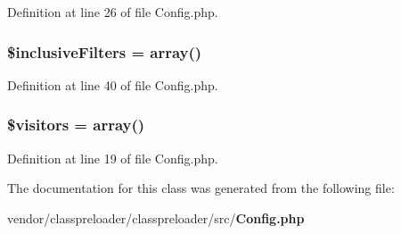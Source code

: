 Definition at line 26 of file Config.\+php.

\subsubsection[{\$inclusive\+Filters}]{\setlength{\rightskip}{0pt plus 5cm}\$inclusive\+Filters = array()\hspace{0.3cm}{\ttfamily [protected]}}\label{class_class_preloader_1_1_config_aa0fb77bb7649955e8f315a8ca929993c}


Definition at line 40 of file Config.\+php.

\subsubsection[{\$visitors}]{\setlength{\rightskip}{0pt plus 5cm}\$visitors = array()\hspace{0.3cm}{\ttfamily [protected]}}\label{class_class_preloader_1_1_config_a63a73490fa0428629a602fd9042a95aa}


Definition at line 19 of file Config.\+php.



The documentation for this class was generated from the following file\+:\begin{DoxyCompactItemize}
\item 
vendor/classpreloader/classpreloader/src/{\bf Config.\+php}\end{DoxyCompactItemize}
